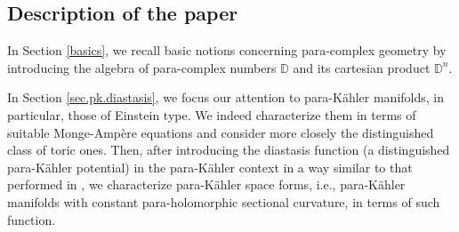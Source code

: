 \documentclass[11pt, reqno]{amsart}
\newtheorem{theor}{Theorem}[section]
\newcommand{\Z}{\mathds{Z}}
\newcommand{\DP}{\mathds{D}\mathds{P}}
\newcommand{\CP}{\mathds{D}\mathds{P}}
\newcommand{\de}{\partial}
\newcommand{\D}{\mathds{D}}
\newcommand{\KE }{K\"{a}hler-Einstein }
\newcommand{\pk }{para-K\"{a}hler }
\begin{document}


\subsection{Description of the paper}


In Section \ref{basics}, we recall basic notions concerning para-complex geometry by introducing the algebra of para-complex numbers $\D$ and its cartesian product $\D^n$.

\noindent
In Section \ref{sec.pk.diastasis}, we focus our attention to \pk manifolds, in particular, those of Einstein type. We indeed characterize them in terms of suitable Monge-Ampère equations and consider more closely the distinguished class of toric ones. Then, after introducing the diastasis function (a distinguished \pk potential) in the \pk context in a way similar to that performed in \cite{Cal}, we characterize \pk space forms, i.e., \pk manifolds with constant para-holomorphic sectional curvature, in terms of such function.
\end{document}
